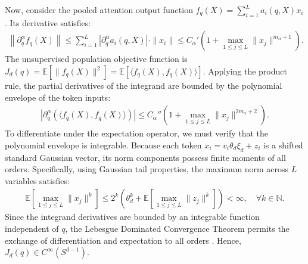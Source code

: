 \documentclass[11pt,a4paper]{article}
\theoremstyle{definition}
\begin{document}
Now, consider the pooled attention output function $f_q(X) = \sum_{i=1}^L a_i(q, X) x_i$. Its derivative satisfies:
\begin{align}
\left\| \partial_q^\alpha f_q(X) \right\| \le \sum_{i=1}^L \left| \partial_q^\alpha a_i(q, X) \right| \cdot \|x_i\| \le C_\alpha' \left(1 + \max_{1 \le j \le L} \|x_j\|^{m_\alpha + 1}\right).
\end{align}
The unsupervised population objective function is $J_d(q) = \mathbb{E}\left[ \|f_q(X)\|^2 \right] = \mathbb{E}\left[ \langle f_q(X), f_q(X) \rangle \right]$. Applying the product rule, the partial derivatives of the integrand are bounded by the polynomial envelope of the token inputs:
\begin{align}
\left| \partial_q^\alpha \left( \langle f_q(X), f_q(X) \rangle \right) \right| \le C_\alpha'' \left(1 + \max_{1 \le j \le L} \|x_j\|^{2m_\alpha + 2}\right).
\end{align}
To differentiate under the expectation operator, we must verify that the polynomial envelope is integrable. Because each token $x_i = v_i \theta_d \xi_d + z_i$ is a shifted standard Gaussian vector, its norm components possess finite moments of all orders. Specifically, using Gaussian tail properties, the maximum norm across $L$ variables satisfies:
\begin{align}
\mathbb{E}\left[ \max_{1 \le j \le L} \|x_j\|^k \right] \le 2^k \left( \theta_d^k + \mathbb{E}\left[ \max_{1 \le j \le L} \|z_j\|^k \right] \right) < \infty, \quad \forall k \in \mathbb{N}.
\end{align}
Since the integrand derivatives are bounded by an integrable function independent of $q$, the Lebesgue Dominated Convergence Theorem permits the exchange of differentiation and expectation to all orders \cite{Royden}. Hence, $J_d(q) \in C^\infty(S^{d-1})$.
\end{document}
